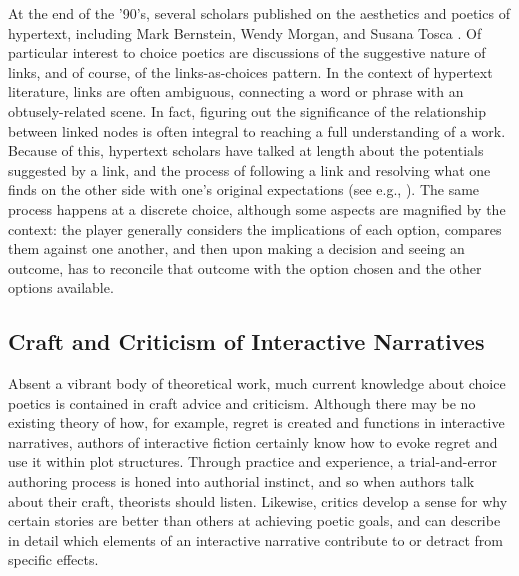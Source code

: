 At the end of the '90's, several scholars published on the aesthetics and poetics of hypertext, including Mark Bernstein, Wendy Morgan, and Susana Tosca \citep{Bernstein1998,Morgan1999,Tosca1999,Tosca2000}.
%
Of particular interest to choice poetics are discussions of the suggestive nature of links, and of course, of the links-as-choices pattern.
%
In the context of hypertext literature, links are often ambiguous, connecting a word or phrase with an obtusely-related scene.
%
In fact, figuring out the significance of the relationship between linked nodes is often integral to reaching a full understanding of a work.
%
Because of this, hypertext scholars have talked at length about the potentials suggested by a link, and the process of following a link and resolving what one finds on the other side with one's original expectations (see e.g., \citep{Tosca2000}).
%
The same process happens at a discrete choice, although some aspects are magnified by the context: the player generally considers the implications of each option, compares them against one another, and then upon making a decision and seeing an outcome, has to reconcile that outcome with the option chosen and the other options available.


\subsection{Craft and Criticism of Interactive Narratives}

Absent a vibrant body of theoretical work, much current knowledge about choice poetics is contained in craft advice and criticism.
%
Although there may be no existing theory of how, for example, regret is created and functions in interactive narratives, authors of interactive fiction certainly know how to evoke regret and use it within plot structures.
%
Through practice and experience, a trial-and-error authoring process is honed into authorial instinct, and so when authors talk about their craft, theorists should listen.
%
Likewise, critics develop a sense for why certain stories are better than others at achieving poetic goals, and can describe in detail which elements of an interactive narrative contribute to or detract from specific effects.



